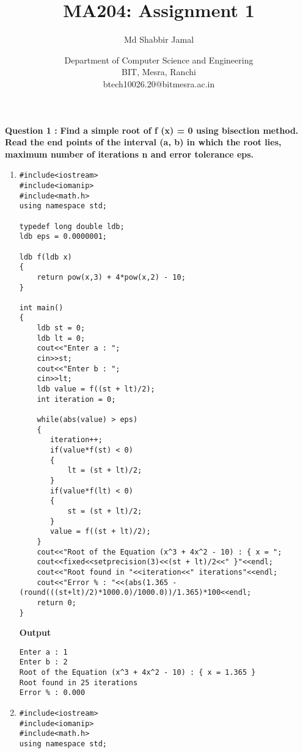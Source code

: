 \documentclass{article}
\title{MA204: Assignment 1}
\author{Md Shabbir Jamal}
\date{Department of Computer Science and Engineering\\
BIT, Mesra, Ranchi\\
btech10026.20@bitmesra.ac.in
}
\begin{document}
\maketitle
{\Large\textbf{Question 1 :}}
\textbf {Find a simple root of f (x) = 0 using bisection method. Read the end points of the interval (a, b) in which the root lies, maximum number of iterations n and error tolerance eps.}
\begin{enumerate}
\item {
\bgroup{}
\begin{verbatim}
#include<iostream>
#include<iomanip>
#include<math.h>
using namespace std;

typedef long double ldb;
ldb eps = 0.0000001;

ldb f(ldb x)
{
    return pow(x,3) + 4*pow(x,2) - 10;
}

int main()
{
    ldb st = 0;
    ldb lt = 0;
    cout<<"Enter a : ";
    cin>>st;
    cout<<"Enter b : ";
    cin>>lt;
    ldb value = f((st + lt)/2);
    int iteration = 0;

    while(abs(value) > eps)
    {
       iteration++;
       if(value*f(st) < 0)
       {
           lt = (st + lt)/2; 
       }
       if(value*f(lt) < 0)
       {
           st = (st + lt)/2; 
       }
       value = f((st + lt)/2);
    }
    cout<<"Root of the Equation (x^3 + 4x^2 - 10) : { x = ";
    cout<<fixed<<setprecision(3)<<(st + lt)/2<<" }"<<endl;
    cout<<"Root found in "<<iteration<<" iterations"<<endl;
    cout<<"Error % : "<<(abs(1.365 - (round(((st+lt)/2)*1000.0)/1000.0))/1.365)*100<<endl;
    return 0;
}
\end{verbatim}
\textbf{Output}
\begin{verbatim}
Enter a : 1
Enter b : 2
Root of the Equation (x^3 + 4x^2 - 10) : { x = 1.365 }
Root found in 25 iterations
Error % : 0.000
\end{verbatim}
}

\item {
\bgroup{}
\begin{verbatim}
#include<iostream>
#include<iomanip>
#include<math.h>
using namespace std;


\end{verbatim}}
\end{enumerate}
\end{document}
